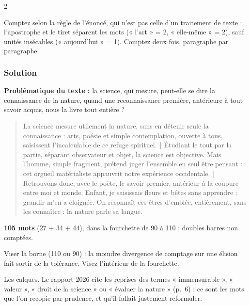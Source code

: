 \documentclass[11pt,a4paper]{article}
\begin{document}
\begin{indication}{2}

Comptez selon la règle de l'énoncé, qui n'est pas celle d'un traitement de texte : l'apostrophe et le tiret séparent les mots (« l'art » = 2, « elle-même » = 2), sauf unités insécables (« aujourd'hui » = 1). Comptez deux fois, paragraphe par paragraphe.

\end{indication}

\hypertarget{solution-2}{%
\subsubsection{Solution}\label{solution-2}}

\textbf{Problématique du texte :} la science, qui mesure, peut-elle se dire la connaissance de la nature, quand une reconnaissance première, antérieure à tout savoir acquis, nous la livre tout entière ?

\begin{quote}

La science mesure utilement la nature, sans en détenir seule la connaissance : arts, poésie et simple contemplation, ouverte à tous, saisissent l'incalculable de ce refuge spirituel. ‖ Étudiant le tout par la partie, séparant observateur et objet, la science est objective. Mais l'homme, simple fragment, prétend juger l'ensemble en seul être pensant : cet orgueil matérialiste appauvrit notre expérience occidentale. ‖ Retrouvons donc, avec le poète, le savoir premier, antérieur à la coupure entre moi et monde. Enfant, je saisissais fleurs et bêtes sans apprendre ; grandir m'en a éloignée. On reconnaît ces êtres d'emblée, entièrement, sans les connaître : la nature parle sa langue.

\end{quote}

\textbf{105 mots} (27 + 34 + 44), dans la fourchette de 90 à 110 ; doubles barres non comptées.

\begin{piege}

Viser la borne (110 ou 90) : la moindre divergence de comptage sur une élision fait sortir de la tolérance. Visez l'intérieur de la fourchette.

\end{piege}

\begin{piege}

Les calques. Le rapport 2026 cite les reprises des termes « immensurable », « valeur », « droit de la science » ou « évaluer la nature » (p.~6) : ce sont les mots que l'on recopie par prudence, et qu'il fallait justement reformuler.

\end{piege}
\end{document}
